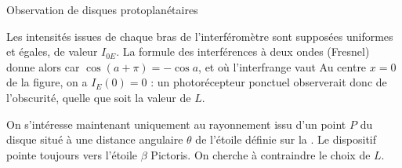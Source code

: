 \begin{exo}[PC][1][devoir]{Observation de disques protoplanétaires}
\begin{quest}
{  }{
    Les intensités issues de chaque bras de l'interféromètre sont supposées uniformes et égales, de valeur $I_{0E}$. La formule des interférences à deux ondes (Fresnel) donne alors 
  car $\cos(a+\pi) = -\cos a$, et où l'interfrange vaut 
  Au centre $x=0$ de la figure, on a $I_E(0) = 0$ : un photorécepteur ponctuel observerait donc de l'obscurité, quelle que soit la valeur de $L$.
  }
\end{quest}

On s'intéresse maintenant uniquement au rayonnement issu d'un point $P$ du disque situé à une distance angulaire $\theta$ de l'étoile définie sur la . Le dispositif pointe toujours vers l'étoile $\beta$ Pictoris. On cherche à contraindre le choix de $L$.


\end{exo}
